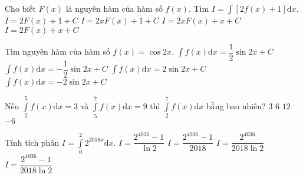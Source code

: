 \begin{ex}%
	Cho biết $F(x)$ là nguyên hàm của hàm số $f(x)$. Tìm $I=\displaystyle \int \limits [2f(x)+1]\mathrm{d}x$.
	\choice
	{$I=2F(x)+1+C $}
	{$I=2xF(x)+1+C $}
	{$I=2xF(x)+x+C $}
	{\True $I=2F(x)+x+C $}
\end{ex}

\begin{ex}%
	Tìm nguyên hàm của hàm số $f(x)=\cos 2x$.
	\choice
	{\True  $\displaystyle \int \limits f(x) \mathrm{d}x=\dfrac{1}{2}\sin 2x+C $}
	{$\displaystyle \int \limits f(x) \mathrm{d}x=-\dfrac{1}{2}\sin 2x+C  $}
	{$\displaystyle \int \limits f(x) \mathrm{d}x=2 \sin 2x+C  $}
	{$\displaystyle \int \limits f(x) \mathrm{d}x=-2 \sin 2x+C  $}
\end{ex}


\begin{ex}%
	Nếu $\displaystyle \int \limits_2^5f(x)\mathrm{d}x=3$ và $\displaystyle \int \limits_5^7f(x)\mathrm{d}x=9$ thì $\displaystyle \int \limits_2^7f(x)\mathrm{d}x$ bằng bao nhiêu?
	\choice
	{$3 $}
	{$6 $}
	{\True $12 $}
	{ $ -6$}
\end{ex}

\begin{ex}%
	Tính tích phân $I=\displaystyle \int \limits _0^2 2^{2018x} \mathrm{d}x$.
	\choice
	{$I=\dfrac{2^{4036}-1}{\ln 2}$}
	{$I=\dfrac{2^{4036}-1}{2018}$}
	{$I=\dfrac{2^{4036}}{2018 \ln2} $}
	{\True $I=\dfrac{2^{4036}-1}{2018 \ln 2} $}
\end{ex}

